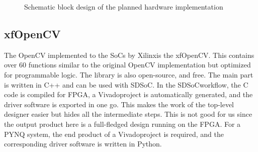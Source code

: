\begin{figure}
    \centering
{}
    \caption{Schematic block design of the planned hardware implementation}
    \label{fig:block_schem}
\end{figure}

\subsection{xfOpenCV} %
The OpenCV implemented to the SoCs by Xilinx\texttrademark is the xfOpenCV.
This contains over 60 functions similar to the original OpenCV implementation but optimized for programmable logic.
The library is also open-source, and free.
The main part is written in C++ and can be used with SDSoC\texttrademark.
In the SDSoC\texttrademark workflow, the C code is compiled for FPGA, a Vivado\texttrademark project is automatically generated, and the driver software is exported in one go.
This makes the work of the top-level designer easier but hides all the intermediate steps.
This is not good for us since the output product here is a full-fledged design running on the FPGA.
For a PYNQ system, the end product of a Vivado\texttrademark project is required, and the corresponding driver software is written in Python.

